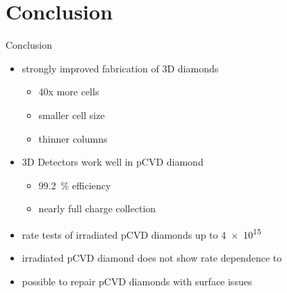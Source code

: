 \section{Conclusion}
\begin{frame}{Conclusion}

	\begin{minipage}[c][5cm]{\textwidth}
		\begin{itemize}\itemfill
			\item strongly improved fabrication of 3D diamonds
			\begin{itemize}
				\item 40x more cells
				\item smaller cell size
				\item thinner columns\vspace*{5pt}
			\end{itemize}
			\item 3D Detectors work well in pCVD diamond
			\begin{itemize}
				\item \SI{99.2}{\%} efficiency
				\item nearly full charge collection\vspace*{5pt}
			\end{itemize}
			\item rate tests of irradiated pCVD diamonds up to \SI{4e15}{\ncm}
			\item irradiated pCVD diamond does not show rate dependence to  
			\item possible to repair pCVD diamonds with surface issues
		\end{itemize}
	\end{minipage}
	
\end{frame}
